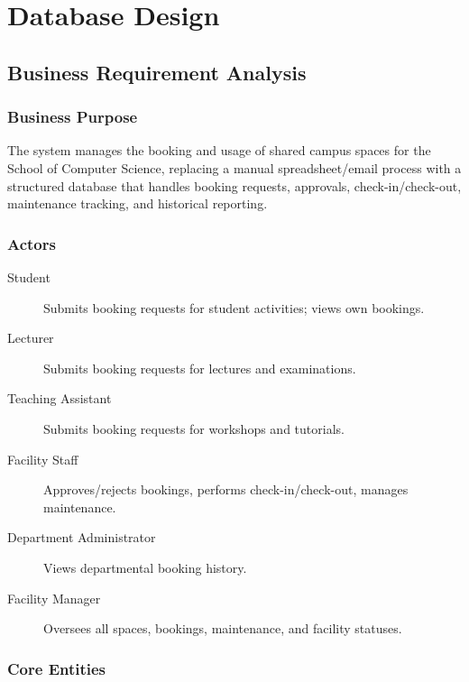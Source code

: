 \section{Database Design}

\subsection{Business Requirement Analysis}

\subsubsection{Business Purpose}

The system manages the booking and usage of shared campus spaces for the School of Computer Science, replacing a manual spreadsheet/email process with a structured database that handles booking requests, approvals, check-in/check-out, maintenance tracking, and historical reporting.

\subsubsection{Actors}

\begin{description}
	\item[Student] Submits booking requests for student activities; views own bookings.
	\item[Lecturer] Submits booking requests for lectures and examinations.
	\item[Teaching Assistant] Submits booking requests for workshops and tutorials.
	\item[Facility Staff] Approves/rejects bookings, performs check-in/check-out, manages maintenance.
	\item[Department Administrator] Views departmental booking history.
	\item[Facility Manager] Oversees all spaces, bookings, maintenance, and facility statuses.
\end{description}

\subsubsection{Core Entities}

\newcommand{\col}[1]{\texttt{#1}\allowbreak}


